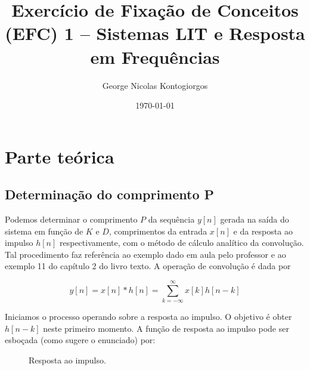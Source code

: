 \documentclass[x11names,a4paper,12pt]{article}
\title{Exercício de Fixação de Conceitos (EFC) 1 – Sistemas LIT e Resposta em Frequências}
\author{George Nicolas Kontogiorgos}
\date{\today}
\begin{document}
\maketitle

\tableofcontents

\section{Parte teórica}

\subsection{Determinação do comprimento P} \label{ssec:p_length}

Podemos determinar o comprimento $P$ da sequência $y[n]$ gerada na saída do sistema em função de $K$ e $D$, comprimentos da entrada $x[n]$ e da resposta ao impulso $h[n]$ respectivamente, com o método de cálculo analítico da convolução. Tal procedimento faz referência ao exemplo dado em aula pelo professor e ao exemplo 11 do capítulo 2 do  livro texto. A operação de convolução é dada por

\begin{equation}
  y[n]=x[n]*h[n]=\sum_{k=-\infty}^{\infty}{x[k]h[n-k]}
  \label{eqn:discrete_convolution}
\end{equation}

Iniciamos o processo operando sobre a resposta ao impulso. O objetivo é obter $h[n-k]$ neste primeiro momento. A função de resposta ao impulso pode ser esboçada (como sugere o enunciado) por:

\begin{figure}[H]
  \centering
  \caption{Resposta ao impulso.}
  \label{fig:impulse_respose}
\end{figure}
\end{document}
